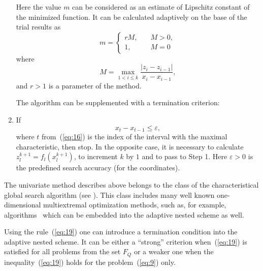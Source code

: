 \documentclass[smallextended]{svjour3}
\let\origref\ref
\renewcommand{\ref}[1]{(\origref{#1})}
\begin{document}
\begin{enumerate}[label=\bfseries Step \arabic*., leftmargin=0em, itemindent=*, itemsep=1em]
  Here the value $m$ can be considered as an estimate of Lipschitz constant of the minimized function. It can be calculated adaptively on the base of the trial results as
  \begin{equation}
  \label{eq:18}
    m =
      \begin{cases}
      rM, & \quad M > 0, \\
       1, & \quad M = 0
      \end{cases}
  \end{equation}
  where
  \begin{equation*}
  M = \max_{1 < i \leq k} \frac{|z_i - z_{i - 1}|}{x_i - x_{i - 1}},
  \end{equation*}
  and $r > 1$ is a parameter of the method.

  The algorithm can be supplemented with a termination criterion:

  \item If
  \begin{equation}
  \label{eq:19}
  x_t - x_{t - 1} \leq \varepsilon,
  \end{equation}
  where $t$ from~\ref{eq:16} is the index of the interval with the maximal characteristic, then stop. In the opposite case, it is necessary to calculate $z_l^{k + 1} = f_l(x_l^{k + 1})$, to increment $k$ by $1$ and to pass to Step 1. Here $\varepsilon > 0$ is the predefined search accuracy (for the coordinates).
\end{enumerate}
The univariate method describes above belongs to the class of the characteristical global search algorithm (see \cite{Ref11, Ref36}). This class includes many well known one-dimensional multiextremal optimization methods, such as, for example, algorithms~\cite{Ref18, Ref25, Ref26, Ref32, Ref36} which can be embedded into the adaptive nested scheme as well.

Using the rule~\ref{eq:19} one can introduce a termination condition into the adaptive nested scheme. It can be either a ``strong'' criterion when~\ref{eq:19} is satisfied for all problems from the set $F_Q$ or a weaker one when the inequality~\ref{eq:19} holds for the problem~\ref{eq:9} only.
\end{document}
